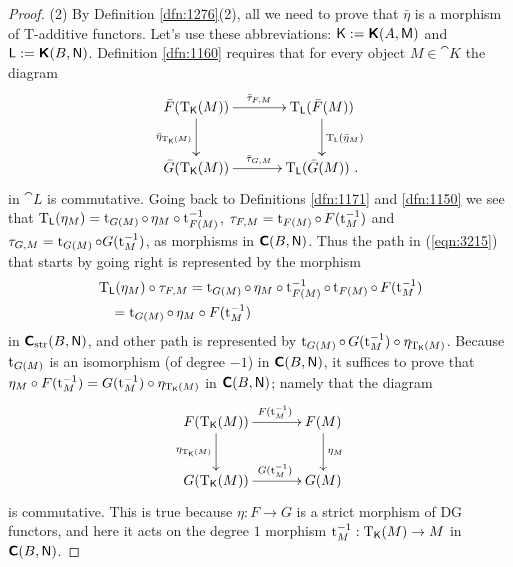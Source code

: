 \begin{proof}
\medskip \noindent
(2) By Definition \ref{dfn:1276}(2), all we need to prove that $\bar{\eta}$ is 
a morphism of T-add\-itive functors. Let's use these abbreviations:
$\operatorname{\mathsf{K}} := \boldsymbol{\mathsf{K}}(A, \operatorname{\mathsf{M}})$ and 
$\operatorname{\mathsf{L}} := \boldsymbol{\mathsf{K}}(B, \operatorname{\mathsf{N}})$. 
Definition \ref{dfn:1160} requires that for every object 
$M \in \cat{K}$ the diagram 
\begin{equation} \label{eqn:3215}
\UseTips  \xymatrix @C=8ex @R=6ex {
\bar{F}(\opn{T}_{\cat{K}}(M))
\ar[r]^{\bar{\tau}_{F, M}}
\ar[d]_{\bar{\eta}_{\opn{T}_{\cat{K}}(M)}}
&
\opn{T}_{\cat{L}}(\bar{F}(M))
\ar[d]^{\opn{T}_{\cat{L}}(\bar{\eta}_M)}
\\
\bar{G}(\opn{T}_{\cat{K}}(M))
\ar[r]^{\bar{\tau}_{G, M}}
&
\opn{T}_{\cat{L}}(\bar{G}(M)) \ . 
} 
\end{equation}
in $\cat{L}$ is commutative.
Going back to Definitions \ref{dfn:1171} and \ref{dfn:1150}  we see that 
$\operatorname{T}_{\operatorname{\mathsf{L}}}(\eta_M) = \operatorname{t}_{G(M)} \circ \, \eta_M \circ 
\operatorname{t}_{F(M)}^{-1}$,
$\tau_{F, M} = \operatorname{t}_{F(M)} \circ \, F(\operatorname{t}_M^{-1})$
and 
$\tau_{G, M} = \operatorname{t}_{G(M)} \circ G(\operatorname{t}_M^{-1})$, 
as morphisms in  $\boldsymbol{\mathsf{C}}(B, \operatorname{\mathsf{N}})$.
Thus the path in (\ref{eqn:3215}) that starts by going right is represented by 
the morphism 
\[ \begin{aligned}
&
\operatorname{T}_{\operatorname{\mathsf{L}}}(\eta_M) \circ \tau_{F, M} =
\operatorname{t}_{G(M)} \circ \, \eta_M \circ \operatorname{t}_{F(M)}^{-1} \circ 
\operatorname{t}_{F(M)} \circ \, F(\operatorname{t}_M^{-1})
\\
& \quad 
= \operatorname{t}_{G(M)} \circ \, \eta_M \circ F(\operatorname{t}_M^{-1})  
\end{aligned} \]
in $\boldsymbol{\mathsf{C}}_{\mathrm{str}}(B, \operatorname{\mathsf{N}})$, and other path is represented by 
$\operatorname{t}_{G(M)} \circ \, G(\operatorname{t}_M^{-1}) \circ 
\eta_{ \operatorname{T}_{\operatorname{\mathsf{K}}}(M)}$.
Because $\operatorname{t}_{G(M)}$ is an isomorphism (of degree $-1$) in 
$\boldsymbol{\mathsf{C}}(B, \operatorname{\mathsf{N}})$, it suffices to prove that 
$\eta_M \circ F(\operatorname{t}_M^{-1}) =  G(\operatorname{t}_M^{-1}) \circ
\eta_{\operatorname{T}_{\operatorname{\mathsf{K}}}(M)}$
in $\boldsymbol{\mathsf{C}}(B, \operatorname{\mathsf{N}})$; namely that the diagram 
\[ \UseTips  \xymatrix @C=8ex @R=6ex {
F(\opn{T}_{\cat{K}}(M))
\ar[r]^(0.55){F(\opn{t}_M^{-1})}
\ar[d]_{\eta_{\lms \opn{T}_{\cat{K}}(M)}}
&
F(M)
\ar[d]^{\eta_M}
\\
G(\opn{T}_{\cat{K}}(M))
\ar[r]^(0.55){G(\opn{t}_M^{-1})}
&
G(M)
} \]
is commutative. This is true because $\eta :F \to G$ is a strict morphism of DG 
functors, and here it acts on the degree $1$ morphism 
$\operatorname{t}_M^{-1} : \operatorname{T}_{\operatorname{\mathsf{K}}}(M) \to M$
in $\boldsymbol{\mathsf{C}}(B, \operatorname{\mathsf{N}})$.
\end{proof}

